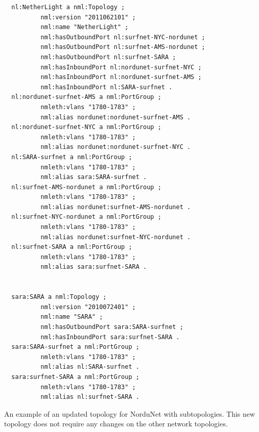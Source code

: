 \documentclass{article}
\begin{document}
\begin{verbatim}
  nl:NetherLight a nml:Topology ;
          nml:version "2011062101" ;
          nml:name "NetherLight" ;
          nml:hasOutboundPort nl:surfnet-NYC-nordunet ;
          nml:hasOutboundPort nl:surfnet-AMS-nordunet ;
          nml:hasOutboundPort nl:surfnet-SARA ;
          nml:hasInboundPort nl:nordunet-surfnet-NYC ;
          nml:hasInboundPort nl:nordunet-surfnet-AMS ;
          nml:hasInboundPort nl:SARA-surfnet .
  nl:nordunet-surfnet-AMS a nml:PortGroup ;
          nmleth:vlans "1780-1783" ;
          nml:alias nordunet:nordunet-surfnet-AMS .
  nl:nordunet-surfnet-NYC a nml:PortGroup ;
          nmleth:vlans "1780-1783" ;
          nml:alias nordunet:nordunet-surfnet-NYC .
  nl:SARA-surfnet a nml:PortGroup ;
          nmleth:vlans "1780-1783" ;
          nml:alias sara:SARA-surfnet .
  nl:surfnet-AMS-nordunet a nml:PortGroup ;
          nmleth:vlans "1780-1783" ;
          nml:alias nordunet:surfnet-AMS-nordunet .
  nl:surfnet-NYC-nordunet a nml:PortGroup ;
          nmleth:vlans "1780-1783" ;
          nml:alias nordunet:surfnet-NYC-nordunet .
  nl:surfnet-SARA a nml:PortGroup ;
          nmleth:vlans "1780-1783" ;
          nml:alias sara:surfnet-SARA .


  sara:SARA a nml:Topology ;
          nml:version "2010072401" ;
          nml:name "SARA" ;
          nml:hasOutboundPort sara:SARA-surfnet ;
          nml:hasInboundPort sara:surfnet-SARA .
  sara:SARA-surfnet a nml:PortGroup ;
          nmleth:vlans "1780-1783" ;
          nml:alias nl:SARA-surfnet .
  sara:surfnet-SARA a nml:PortGroup ;
          nmleth:vlans "1780-1783" ;
          nml:alias nl:surfnet-SARA .
\end{verbatim}



 An example of an updated topology for NorduNet with subtopologies. 
This new topology does not require any changes on the other network topologies.
\end{document}
